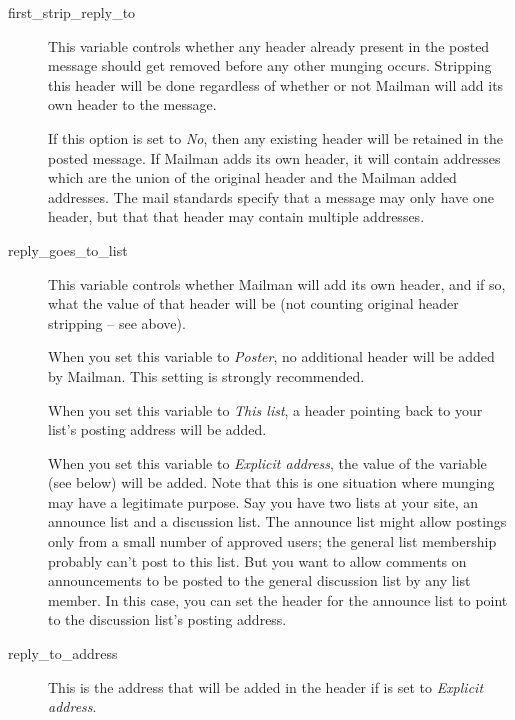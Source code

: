 \documentclass{howto}
\begin{document}
\begin{description}

\item[first_strip_reply_to]
    This variable controls whether any  header
    already present in the posted message should get removed before
    any other munging occurs.  Stripping this header will be done
    regardless of whether or not Mailman will add its own
     header to the message.

    If this option is set to \emph{No}, then any existing
     header will be retained in the posted
    message.  If Mailman adds its own header, it will contain
    addresses which are the union of the original header and the
    Mailman added addresses.  The mail standards specify that a
    message may only have one  header, but that
    that header may contain multiple addresses.

\item[reply_goes_to_list]
    This variable controls whether Mailman will add its own
     header, and if so, what the value of that
    header will be (not counting original header stripping -- see
    above).

    When you set this variable to \emph{Poster}, no additional
     header will be added by Mailman.  This
    setting is strongly recommended.

    When you set this variable to \emph{This list}, a
     header pointing back to your list's posting
    address will be added.

    When you set this variable to \emph{Explicit address}, the value
    of the variable  (see below) will be
    added.  Note that this is one situation where
     munging may have a legitimate purpose.  Say
    you have two lists at your site, an announce list and a discussion
    list.  The announce list might allow postings only from a small
    number of approved users; the general list membership probably
    can't post to this list.  But you want to allow comments on
    announcements to be posted to the general discussion list by any
    list member.  In this case, you can set the 
    header for the announce list to point to the discussion list's
    posting address.

\item[reply_to_address]
    This is the address that will be added in the
     header if  is set
    to \emph{Explicit address}.

\end{description}
\end{document}
